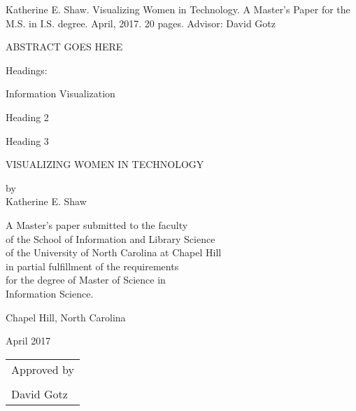 \documentclass{article}
\newcommand{\bigmargins}{\vspace*{0.5in}}
\newcommand{\mytitle}{Visualizing Women in Technology}
\begin{document}
\thispagestyle{empty}
\singlespace
\noindent Katherine E. Shaw. \mytitle. A Master's Paper for the M.S. in I.S. degree. April, 2017. 20 pages. Advisor: David Gotz

\vspace{0.2in} %

\noindent ABSTRACT GOES HERE %

\vspace{1in} %

\doublespace
\noindent Headings:

Information Visualization

Heading 2

Heading 3


\clearpage


\bigmargins
\thispagestyle{empty}
\begin{center}
\MakeUppercase{\mytitle}

\vspace{1in} %
{\singlespace by\\Katherine E. Shaw

}

\vspace{1in} %
{\singlespace
  A Master's paper submitted to the faculty\\
  of the School of Information and Library Science\\
  of the University of North Carolina at Chapel Hill\\
  in partial fulfillment of the requirements\\
  for the degree of Master of Science in\\
  Information Science.

}

\vspace{1in} %
Chapel Hill, North Carolina

April 2017

\vspace{1in} %
\hfill\begin{tabular}{@{}p{3.25in}@{}}
Approved by \\

\\ \hline
David Gotz
\end{tabular}

\end{center}
\clearpage
\end{document}
